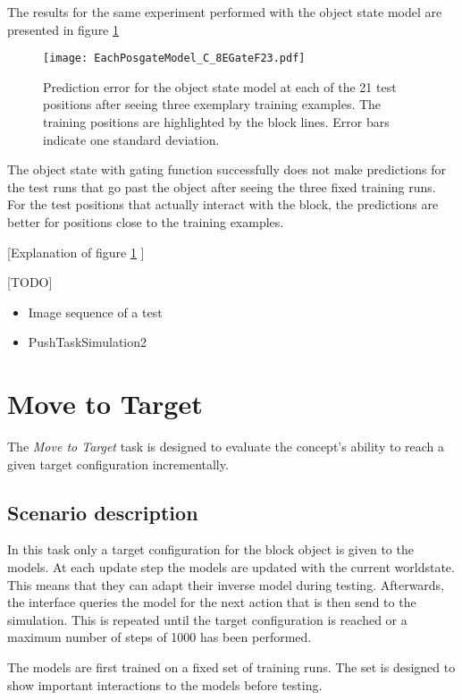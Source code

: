 The results for the same experiment performed with the object state model are presented in figure \ref{fig:eachPosGate}

\begin{figure}
\centering
\texttt{[image: EachPosgateModel\_C\_8EGateF23.pdf]}
\caption{Prediction error for the object state model at each of the 21 test positions after seeing three exemplary training examples. The training positions are highlighted by the block lines. Error bars indicate one standard deviation.}
\label{fig:eachPosGate}
\end{figure}

The object state with gating function successfully does not make predictions for the test runs that go past the object after seeing the three fixed training runs. For the test positions that actually interact with the block, the predictions are better for positions close to the training examples. %

[Explanation of figure \ref{fig:eachPosGate} ]

[TODO]
\begin{itemize}
\item Image sequence of a test
\item PushTaskSimulation2
\end{itemize}


\section{Move to Target \label{sec:moveToTarget}}

The \textit{Move to Target} task is designed to evaluate the concept's ability to reach a given target configuration incrementally. 

\subsection{Scenario description}

In this task only a target configuration for the block object is given to the models. At each update step the models are updated with the current worldstate.
This means that they can adapt their inverse model during testing.
Afterwards, the interface queries the model for the next action that is then send to the simulation. This is repeated until the target configuration is reached or a maximum number of steps of 1000 %
has been performed.

The models are first trained on a fixed set of training runs. The set is designed to show important interactions to the models before testing.

